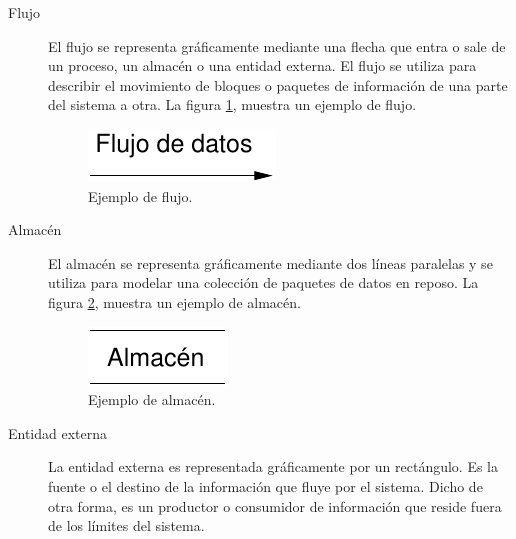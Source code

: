 \begin{description}
   \item[Flujo] El flujo se representa gráficamente mediante una flecha que
        entra o sale de un proceso, un almacén o una entidad externa. El flujo
        se utiliza para describir el movimiento de bloques o paquetes de
        información de una parte del sistema a otra. La figura
        \ref{diagramaFlujo}, muestra un ejemplo de flujo.

        \begin{figure}[!ht]
            \begin{center}
            \includegraphics[]{08.Analisis_Funcional/8.2.DFDs/Diagramas/flujo.pdf}
            \caption{Ejemplo de flujo.}
            \label{diagramaFlujo}
            \end{center}
         \end{figure}

   \item[Almacén] El almacén se representa gráficamente mediante dos líneas
        paralelas y se utiliza para modelar una colección de paquetes
        de datos en reposo. La figura
        \ref{diagramaAlmacen}, muestra un ejemplo de almacén.

        \begin{figure}[!ht]
            \begin{center}
            \includegraphics[]{08.Analisis_Funcional/8.2.DFDs/Diagramas/almacen.pdf}
            \caption{Ejemplo de almacén.}
            \label{diagramaAlmacen}
            \end{center}
         \end{figure}

   \item[Entidad externa] La entidad externa es representada gráficamente
        por un rectángulo. Es la fuente o el destino de la información que
        fluye por el sistema. Dicho de otra forma, es un productor o consumidor
        de información que reside fuera de los límites del sistema.
  \end{description}

